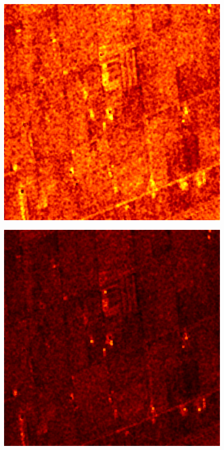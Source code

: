 \begin{center}
  \begin{figure}[h!]
    \includegraphics[width=\textwidth]{../Art/entropyhot.png}
    \label{fig:entropyimage}
   \end{figure}
   
   \begin{figure}[h!]
    \includegraphics[width=\textwidth]{../Art/alphahot.png}
    \label{fig:alphaimage}
   \end{figure}
   

\end{center}
